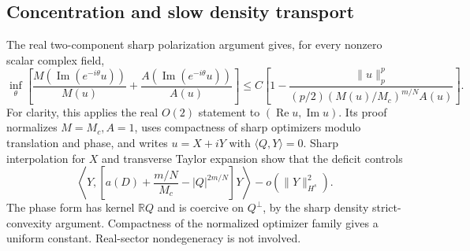 \subsection{Concentration and slow density transport}

The real two-component sharp polarization argument gives, for every
nonzero scalar complex field,
\begin{equation}\label{r13g:phase}
 \inf_\theta\left[
 \frac{M(\operatorname{Im}(e^{-i\theta}u))}{M(u)}+
 \frac{A(\operatorname{Im}(e^{-i\theta}u))}{A(u)}\right]
 \le C\left[1-
 \frac{\|u\|_p^p}{(p/2)(M(u)/M_c)^{m/N}A(u)}\right].
\end{equation}
For clarity, this applies the real $O(2)$ statement to
$(\operatorname{Re}u,\operatorname{Im}u)$. Its proof normalizes
$M=M_c,A=1$, uses compactness of sharp optimizers modulo translation
and phase, and writes $u=X+iY$ with $\langle Q,Y\rangle=0$.
Sharp interpolation for $X$ and transverse Taylor expansion show that
the deficit controls
\[
 \left\langle Y,
 \left[a(D)+\frac{m/N}{M_c}-|Q|^{2m/N}\right]Y\right\rangle
       -o(\|Y\|_{H^s}^2).
\]
The phase form has kernel $\mathbb RQ$ and is coercive on $Q^\perp$,
by the sharp density strict-convexity argument. Compactness of the
normalized optimizer family gives a uniform constant. Real-sector
nondegeneracy is not involved.

